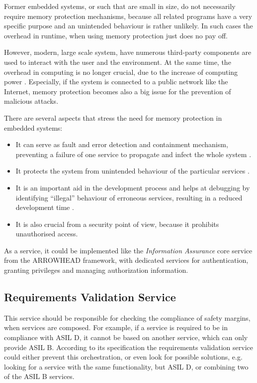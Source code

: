 Former embedded systems, or such that are small in size, do not necessarily require memory protection mechanisms, because all related programs have a very specific purpose and an unintended behaviour is rather unlikely. In such cases the overhead in runtime, when using memory protection just does no pay off. 


However, modern, large scale system, have numerous third-party components are used to interact with the user and the environment. At the same time, the overhead in computing is no longer crucial, due to the increase of computing power  \cite{yamada2008}. Especially, if the system is connected to a public network like the Internet, memory protection becomes also a big issue for the prevention of malicious attacks.

There are several aspects that stress the need for memory protection in embedded systems:
\begin{itemize}
\item It can serve as fault and error detection and containment mechanism, preventing a failure of one service to propagate and infect the whole system \cite{yamada2008}.
\item It protects the system from unintended behaviour of the particular services \cite{yamada2014}.
\item It is an important aid in the development process and helps at debugging by identifying ``illegal'' behaviour of erroneous services, resulting in a reduced development time \cite{yamada2008} \cite{yamada2014}.
\item It is also crucial from a security point of view, because it prohibits unauthorised access.
\end{itemize}

As a service, it could be implemented like the \emph{Information Assurance} core service from the ARROWHEAD framework, with dedicated services for authentication, granting privileges and managing authorization information.


\subsection{Requirements Validation Service}

This service should be responsible for checking the compliance of safety margins, when services are composed. For example, if a service is required to be in compliance with ASIL D, it cannot be based on another service, which can only provide ASIL B. 
According to its specification the requirements validation service could either prevent this orchestration, or even look for possible solutions, e.g. looking for a service with the same functionality, but ASIL D, or combining two of the ASIL B services.

